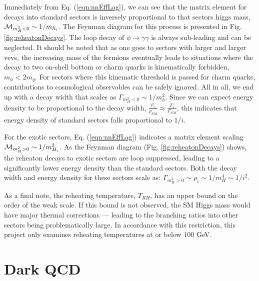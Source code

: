 \documentclass[nofootinbib,twocolumn,preprintnumbers]{revtex4-2}
\begin{document}
Immediately from Eq. (\ref{eqn:nnEffLag}), we can see that the matrix element for decays into standard sectors is inversely proportional to that sectors higgs mass, ${\cal M}_{m_H^2 < 0} \sim 1/m_{h_i}$. The Feynman diagram for this process is presented in Fig. \ref{fig:reheatonDecays}. The loop decay of $\phi \rightarrow \gamma\gamma$ is always sub-leading and can be neglected. It should be noted that as one goes to sectors with larger and larger vevs, the increasing mass of the fermions eventually leads to situations where the decay to two on-shell bottom or charm quarks is kinematically forbidden, $m_\phi < 2 m_q$. For sectors where this kinematic threshold is passed for charm quarks, contributions to cosmological observables can be safely ignored. All in all, we end up with a decay width that scales as $\Gamma_{m_H^2<0} \sim 1/m_h^2$. Since we can expect energy density to be proportional to the decay width, $\frac{\rho_i}{\rho_{SM}} \approx \frac{\Gamma_i}{\Gamma_{SM}}$, this indicates that energy density of standard sectors falls proportional to $1/i$. 

For the exotic sectors, Eq. (\ref{eqn:nnEffLag}) indicates a matrix element scaling ${\cal M}_{m_H^2>0} \sim 1/m_{H_i}^2$. As the Feynman diagram (Fig. \ref{fig:reheatonDecays}) shows, the reheaton decays to exotic sectors are loop suppressed, leading to a significantly lower energy density than the standard sectors. Both the decay width and energy density for these sectors scale as: $\Gamma_{m_H^2>0} \sim \rho_i \sim 1/m_H^4 \sim 1/i^2$. 

As a final note, the reheating temperature, $T_{RH}$, has an upper bound on the order of the weak scale. If this bound is not observed, the SM Higgs mass would have major thermal corrections --- leading to the branching ratios into other sectors being problematically large. In accordance with this restriction, this project only examines reheating temperatures at or below $100$ GeV.


\section{Dark QCD}
\label{sec:dQCD}
\end{document}
